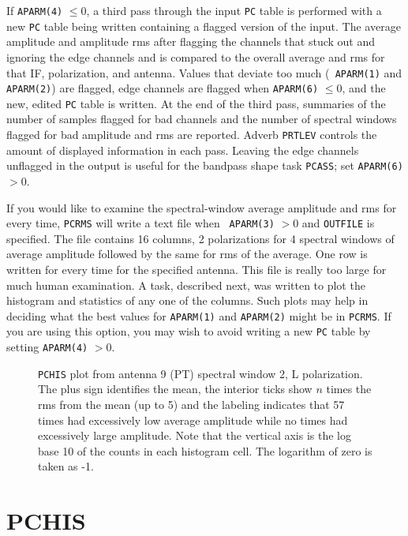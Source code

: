 \documentclass[twoside]{article}
\newcommand{\putfig}[1]{\texttt{[image: \#1.eps]}}
\begin{document}
If {\tt APARM(4)} $\leq 0$, a third pass through the input {\tt PC}
table is performed with a new {\tt PC} table being written containing
a flagged version of the input.  The average amplitude and amplitude
rms after flagging the channels that stuck out and ignoring the edge
channels and is compared to the overall average and rms for that IF,
polarization, and antenna.  Values that deviate too much ({\tt
  APARM(1)} and {\tt APARM(2)}) are flagged, edge channels are flagged
when {\tt APARM(6)} $\leq 0$, and the new, edited {\tt PC} table is
written.  At the end of the third pass, summaries of the number of
samples flagged for bad channels and the number of spectral windows
flagged for bad amplitude and rms are reported.  Adverb {\tt PRTLEV}
controls the amount of displayed information in each pass.  Leaving
the edge channels unflagged in the output is useful for the bandpass
shape task {\tt PCASS}; set {\tt APARM(6)} $> 0$.

If you would like to examine the spectral-window average amplitude and
rms for every time, {\tt PCRMS} will write a text file when {\tt
  APARM(3)} $> 0$ and {\tt OUTFILE} is specified.  The file contains
16 columns, 2 polarizations for 4 spectral windows of average
amplitude followed by the same for rms of the average.  One row is
written for every time for the specified antenna.  This file is really
too large for much human examination.  A task, described next, was
written to plot the histogram and statistics of any one of the
columns.  Such plots may help in deciding what the best values for
{\tt APARM(1)} and {\tt APARM(2)} might be in {\tt PCRMS}\@.  If you
are using this option, you may wish to avoid writing a new {\tt PC}
table by setting {\tt APARM(4)} $> 0$.

\begin{figure}
\begin{center}
\resizebox{6.5in}{!}{\putfig{PCHIS}}
\caption{{\tt PCHIS} plot from antenna 9 (PT) spectral window 2, L
  polarization.  The plus sign identifies the mean, the interior ticks
  show $n$ times the rms from the mean (up to 5) and the labeling
  indicates that 57 times had excessively low average amplitude while
  no times had excessively large amplitude.  Note that the vertical
  axis is the log base 10 of the counts in each histogram cell.  The
  logarithm of zero is taken as -1.}
\label{fig:PCHIS}
\end{center}
\end{figure}
\vfill\eject
\section{PCHIS}
\end{document}
